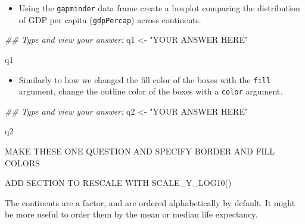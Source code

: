 \documentclass[
  letterpaper,
  DIV=11,
  numbers=noendperiod]{scrreprt}
\newenvironment{Shaded}{\begin{snugshade}}{\end{snugshade}}
\newcommand{\DocumentationTok}[1]{\textcolor[rgb]{0.37,0.37,0.37}{\textit{#1}}}
\newcommand{\NormalTok}[1]{\textcolor[rgb]{0.00,0.23,0.31}{#1}}
\newcommand{\OtherTok}[1]{\textcolor[rgb]{0.00,0.23,0.31}{#1}}
\newcommand{\StringTok}[1]{\textcolor[rgb]{0.13,0.47,0.30}{#1}}
\providecommand{\tightlist}{%
  \setlength{\itemsep}{0pt}\setlength{\parskip}{0pt}}\usepackage{longtable,booktabs,array}
\begin{document}
\begin{tcolorbox}[enhanced jigsaw, colframe=quarto-callout-tip-color-frame, colbacktitle=quarto-callout-tip-color!10!white, titlerule=0mm, opacitybacktitle=0.6, breakable, toprule=.15mm, arc=.35mm, rightrule=.15mm, colback=white, bottomrule=.15mm, opacityback=0, toptitle=1mm, left=2mm, bottomtitle=1mm, title=\textcolor{quarto-callout-tip-color}{\faLightbulb}\hspace{0.5em}{Practice}, leftrule=.75mm, coltitle=black]

\begin{itemize}
\tightlist
\item
  Using the \texttt{gapminder} data frame create a boxplot comparing the
  distribution of GDP per capita (\texttt{gdpPercap}) across continents.
\end{itemize}

\begin{Shaded}
\begin{Highlighting}[]
\DocumentationTok{\#\# Type and view your answer:}
\NormalTok{q1 }\OtherTok{\textless{}{-}} \StringTok{"YOUR ANSWER HERE"} 
  
\NormalTok{q1}
\end{Highlighting}
\end{Shaded}

\begin{itemize}
\tightlist
\item
  Similarly to how we changed the fill color of the boxes with the
  \texttt{fill} argument, change the outline color of the boxes with a
  \texttt{color} argument.
\end{itemize}

\begin{Shaded}
\begin{Highlighting}[]
\DocumentationTok{\#\# Type and view your answer:}
\NormalTok{q2 }\OtherTok{\textless{}{-}} \StringTok{"YOUR ANSWER HERE"} 
  
\NormalTok{q2}
\end{Highlighting}
\end{Shaded}

MAKE THESE ONE QUESTION AND SPECIFY BORDER AND FILL COLORS

ADD SECTION TO RESCALE WITH SCALE\_Y\_LOG10()

\end{tcolorbox}

The continents are a factor, and are ordered alphabetically by default.
It might be more useful to order them by the mean or median life
expectancy.
\end{document}
